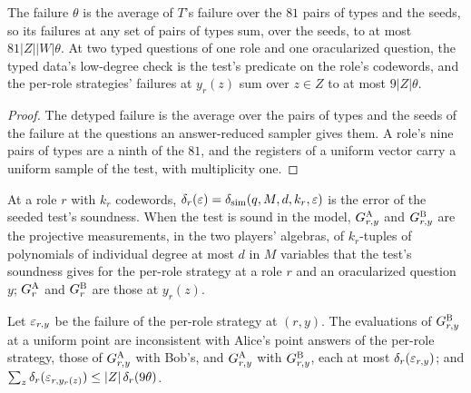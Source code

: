 \begin{lemma}
\label{lem:ar-sound-roles}
\leanok
The failure $\theta$ is the average of $T$'s failure over the $81$ pairs of types and the seeds,
so its failures at any set of pairs of types sum, over the seeds, to at most $81 |Z| |W| \theta$.
At two typed questions of one role and one oracularized question, the typed data's low-degree
check is the test's predicate on the role's codewords, and the per-role strategies' failures at
$y_r(z)$ sum over $z \in Z$ to at most $9 |Z| \theta$.
\end{lemma}

\begin{proof}
\leanok
The detyped failure is the average over the pairs of types and the seeds of the failure at the
questions an answer-reduced sampler gives them. A role's nine pairs of types are a ninth of the
$81$, and the registers of a uniform vector carry a uniform sample of the test, with multiplicity
one.
\end{proof}

\begin{definition}
\label{def:ar-sound-extract}
\leanok
At a role $r$ with $k_r$ codewords, $\delta_r(\varepsilon) = \delta_{\mathrm{sim}}(q, M, d, k_r, \varepsilon)$ is
the error of the seeded test's soundness. When the test is sound in the model, $G^{\textsc{A}}_{r,y}$ and
$G^{\textsc{B}}_{r,y}$ are the projective measurements, in the two players' algebras, of $k_r$-tuples of
polynomials of individual degree at most $d$ in $M$ variables that the test's soundness gives for
the per-role strategy at a role $r$ and an oracularized question $y$; $G^{\textsc{A}}_r$ and $G^{\textsc{B}}_r$
are those at $y_r(z)$.
\end{definition}

\begin{lemma}
\label{lem:ar-sound-extract}
\leanok
Let $\varepsilon_{r,y}$ be the failure of the per-role strategy at $(r, y)$. The evaluations of
$G^{\textsc{B}}_{r,y}$ at a uniform point are inconsistent with Alice's point answers of the per-role
strategy, those of $G^{\textsc{A}}_{r,y}$ with Bob's, and $G^{\textsc{A}}_{r,y}$ with $G^{\textsc{B}}_{r,y}$, each at
most $\delta_r(\varepsilon_{r,y})$; and $\sum_{z} \delta_r(\varepsilon_{r, y_r(z)}) \leq |Z|\,
\delta_r(9 \theta)$.
\end{lemma}

